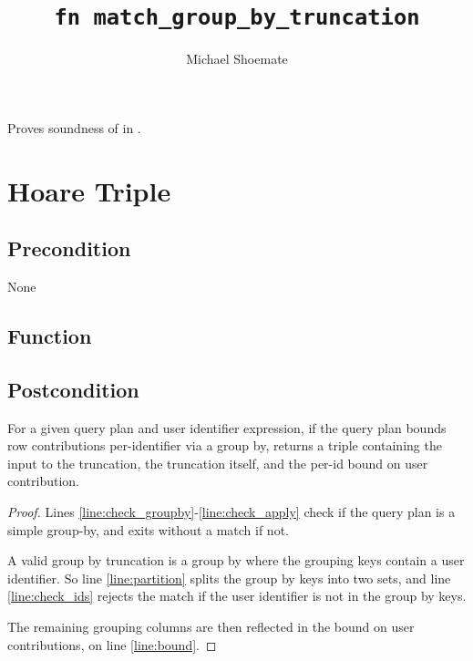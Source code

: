 \documentclass{article}
\title{\texttt{fn match\_group\_by\_truncation}}
\author{Michael Shoemate}
\begin{document}
\maketitle  


\contrib

Proves soundness of  
in .

\section{Hoare Triple}
\subsection*{Precondition}
None 

\subsection*{Function}
\label{sec:python-pseudocode}


\subsection*{Postcondition}
\begin{theorem}[Postcondition]
    For a given query plan and user identifier expression,
    if the query plan bounds row contributions per-identifier via a group by,
    returns a triple containing the input to the truncation, 
    the truncation itself, and the per-id bound on user contribution.
\end{theorem}

\begin{proof}
    Lines \ref{line:check_groupby}-\ref{line:check_apply} check if the query plan is a simple group-by,
    and exits without a match if not.

    A valid group by truncation is a group by where the grouping keys contain a user identifier.
    So line \ref{line:partition} splits the group by keys into two sets, 
    and line \ref{line:check_ids} rejects the match if the user identifier is not in the group by keys.

    The remaining grouping columns are then reflected in the bound on user contributions,
    on line \ref{line:bound}.
\end{proof}
\end{document}
